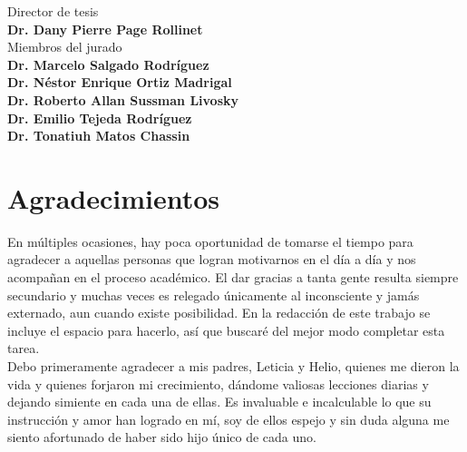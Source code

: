\documentclass[letterpaper, twoside,openright]{book}
\begin{document}
\begin{flushleft}

  \Large{
Director de tesis  }\\[0.5cm]

  \large{ \textbf{Dr. Dany Pierre Page Rollinet} }\\[0.5cm]


  \Large{
Miembros del jurado}\\[0.5cm]


  \large{ \textbf{Dr. Marcelo Salgado Rodríguez} }\\

  \large{ \textbf{Dr. Néstor Enrique Ortiz Madrigal} }\\
  
  \large{ \textbf{Dr. Roberto Allan Sussman Livosky} }\\

  \large{ \textbf{Dr. Emilio Tejeda Rodríguez} }\\

  \large{ \textbf{Dr. Tonatiuh Matos Chassin} }\\



\end{flushleft}


\thispagestyle{empty}



\newpage

\thispagestyle{empty}

\chapter*{Agradecimientos}

\thispagestyle{empty}

En múltiples ocasiones, hay poca oportunidad de tomarse el tiempo para agradecer a aquellas personas que logran motivarnos en el día a día y nos acompañan en el proceso académico. El dar gracias a tanta gente resulta siempre secundario y muchas veces es relegado únicamente al inconsciente y jamás externado, aun cuando existe posibilidad. En la redacción de este trabajo se incluye el espacio para hacerlo, así que buscaré del mejor modo completar esta tarea.\\

Debo primeramente agradecer a mis padres, Leticia y Helio, quienes me dieron la vida y quienes forjaron mi crecimiento, dándome valiosas lecciones diarias y dejando simiente en cada una de ellas. Es invaluable e incalculable lo que su instrucción y amor han logrado en mí, soy de ellos espejo y sin duda alguna me siento afortunado de haber sido hijo único de cada uno.\\
\end{document}

